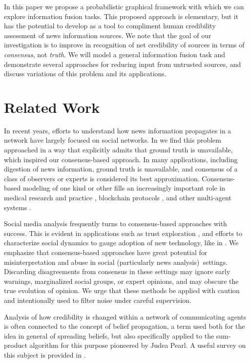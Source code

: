 \documentclass{amsart}
\theoremstyle{plain}
\numberwithin{equation}{section}
\begin{document}
In this paper we propose a probabilistic graphical framework with which we
can explore information fusion tasks. This proposed approach is elementary,
but it has the potential to develop as a tool to compliment human
credibility assessment of news information sources. We note that the goal of
our investigation is to improve in recognition of net credibility of sources
in terms of \emph{consensus}, not \emph{truth}. We will model a general
information fusion task and demonstrate several approaches for reducing
input from untrusted sources, and discuss variations of this problem and its
applications.

\section{Related Work}

In recent years, efforts to understand how news information propagates in a
network have largely focused on social networks. In \cite%
{zafarani2015evaluation} we find this problem approached in a way that
explicitly admits that ground truth is unavailable, which inspired our
consensus-based approach. In many applications, including digestion of news
information, ground truth is unavailable, and consensus of a class of
observers or experts is considered its best approximation. Consensus-based
modeling of one kind or other fills an increasingly important role in
medical research and practice \cite{fink1984consensus}, blockchain protocols 
\cite{sankar2017survey}, and other multi-agent systems \cite{ren2005survey}.

Social media analysis frequently turns to consensus-based approaches with
success. This is evident in applications such as trust exploration \cite%
{heuer2018trust}, and efforts to characterize social dynamics to gauge
adoption of new technology, like in \cite{kohler2001density}. We emphasize
that consensus-based approaches have great potential for misinterpretation
and abuse in social (particularly news analysis)\ settings. Discarding
disagreements from consensus in these settings may ignore early warnings,
marginalized social groups, or expert opinions, and may obscure the true
evolution of opinion. We urge that these methods be applied with caution and
intentionally used to filter noise under careful supervision.

Analysis of how credibility is changed within a network of communicating
agents is often connected to the concept of belief propagation, a term used
both for the idea in general of spreading beliefs, but also specifically
applied to the sum-product algorithm for this purpose pioneered by Judea
Pearl. A useful survey on this subject is provided in \cite%
{yedidia2003understanding}.
\end{document}

